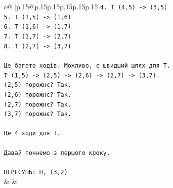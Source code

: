 \documentclass{article}
\begin{document}
{\begin{supertabular}{c@{$\;$}|p{.15\linewidth}@{}p{.15\linewidth}p{.15\linewidth}p{.15\linewidth}p{.15\linewidth}p{.15\linewidth}}
{{{\texttt{4. I (4,5) {-}> (3,5)} \\
\texttt{5. T (1,5) {-}> (1,6)} \\
\texttt{6. T (1,6) {-}> (1,7)} \\
\texttt{7. T (1,7) {-}> (2,7)} \\
\texttt{8. T (2,7) {-}> (3,7)} \\
\\ 
\texttt{Це багато ходів. Можливо, є швидший шлях для T.} \\
\texttt{T (1,5) {-}> (2,5) {-}> (2,6) {-}> (2,7) {-}> (3,7).} \\
\texttt{(2,5) порожнє? Так.} \\
\texttt{(2,6) порожнє? Так.} \\
\texttt{(2,7) порожнє? Так.} \\
\texttt{(3,7) порожнє? Так.} \\
\\ 
\texttt{Це 4 ходи для T.} \\
\\ 
\texttt{Давай почнемо з першого кроку.} \\
\\ 
\texttt{ПЕРЕСУНЬ: H, (3,2)} \\
            }
        }
    }
    & & \\ \\


\end{supertabular}}
\end{document}
